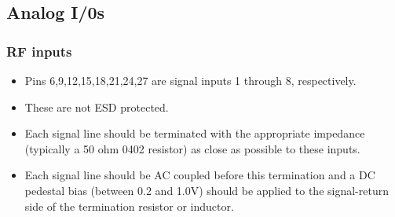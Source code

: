 \documentclass[12pt]{article}
\begin{document}

\subsection*{Analog I/0s}

\subsubsection*{RF inputs}
\begin{itemize}
\item Pins 6,9,12,15,18,21,24,27 are signal inputs 1 through 8, respectively. 
\item These are not ESD protected. 
\item Each signal line should be terminated with the appropriate impedance (typically a 50 ohm 0402 resistor) as close as possible to these inputs. 
\item Each signal line should be AC coupled before this termination and a DC pedestal bias (between 0.2 and 1.0V) should be applied to the signal-return side of the
  termination resistor or inductor.
\end{itemize}
\end{document}
